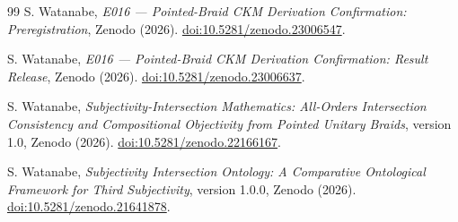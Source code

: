 \documentclass[11pt]{article}
\theoremstyle{definition}
\theoremstyle{remark}
\begin{document}
\begin{thebibliography}{99}
S. Watanabe, \emph{E016 --- Pointed-Braid CKM Derivation Confirmation: Preregistration}, Zenodo (2026). \href{https://doi.org/10.5281/zenodo.23006547}{doi:10.5281/zenodo.23006547}.

S. Watanabe, \emph{E016 --- Pointed-Braid CKM Derivation Confirmation: Result Release}, Zenodo (2026). \href{https://doi.org/10.5281/zenodo.23006637}{doi:10.5281/zenodo.23006637}.

S. Watanabe, \emph{Subjectivity-Intersection Mathematics: All-Orders Intersection Consistency and Compositional Objectivity from Pointed Unitary Braids}, version 1.0, Zenodo (2026). \href{https://doi.org/10.5281/zenodo.22166167}{doi:10.5281/zenodo.22166167}.

S. Watanabe, \emph{Subjectivity Intersection Ontology: A Comparative Ontological Framework for Third Subjectivity}, version 1.0.0, Zenodo (2026). \href{https://doi.org/10.5281/zenodo.21641878}{doi:10.5281/zenodo.21641878}.

\end{thebibliography}
\end{document}
